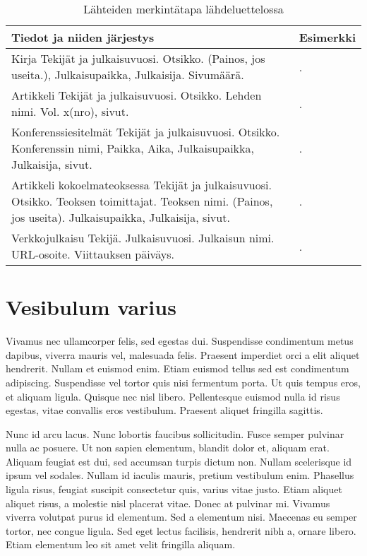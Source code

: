 \begin{table}
\caption{Lähteiden merkintätapa lähdeluettelossa}
\label{table:bibliography}
\begin{center}
\begin{tabular}{ | p{7cm} | p{7cm} | }
	\hline
	\textbf{Tiedot ja niiden järjestys} & \textbf{Esimerkki} \\ \hline
	Kirja \newline 	Tekijät ja julkaisuvuosi. Otsikko. (Painos, jos useita.), Julkaisupaikka, Julkaisija. Sivumäärä. & \fullcite{basar1995dynamic}. \\ \hline
	Artikkeli \newline Tekijät ja julkaisuvuosi. Otsikko. Lehden nimi. Vol. x(nro), sivut. & \fullcite{umble2003enterprise}. \\ \hline
	Konferenssiesitelmät \newline Tekijät ja julkaisuvuosi. Otsikko. Konferenssin nimi, Paikka, Aika, Julkaisupaikka, Julkaisija, sivut. & \fullcite{somers2001impact}. \\ \hline 
	Artikkeli kokoelmateoksessa \newline Tekijät ja julkaisuvuosi. Otsikko. Teoksen toimittajat. Teoksen nimi. (Painos, jos useita). Julkaisupaikka, Julkaisija, sivut. & \fullcite{osmani2013}. \\ \hline
	Verkkojulkaisu \newline Tekijä. Julkaisuvuosi. Julkaisun nimi. URL-osoite. Viittauksen päiväys. & \fullcite{lehman2014biblatex}. \\
	\hline
\end{tabular}
\end{center}
\end{table}

\section{Vesibulum varius}

Vivamus nec ullamcorper felis, sed egestas dui. Suspendisse condimentum metus dapibus, viverra mauris vel, malesuada felis. Praesent imperdiet orci a elit aliquet hendrerit. Nullam et euismod enim. Etiam euismod tellus sed est condimentum adipiscing. Suspendisse vel tortor quis nisi fermentum porta. Ut quis tempus eros, et aliquam ligula. Quisque nec nisl libero. Pellentesque euismod nulla id risus egestas, vitae convallis eros vestibulum. Praesent aliquet fringilla sagittis.

Nunc id arcu lacus. Nunc lobortis faucibus sollicitudin. Fusce semper pulvinar nulla ac posuere. Ut non sapien elementum, blandit dolor et, aliquam erat. Aliquam feugiat est dui, sed accumsan turpis dictum non. Nullam scelerisque id ipsum vel sodales. Nullam id iaculis mauris, pretium vestibulum enim. Phasellus ligula risus, feugiat suscipit consectetur quis, varius vitae justo. Etiam aliquet aliquet risus, a molestie nisl placerat vitae. Donec at pulvinar mi. Vivamus viverra volutpat purus id elementum. Sed a elementum nisi. Maecenas eu semper tortor, nec congue ligula. Sed eget lectus facilisis, hendrerit nibh a, ornare libero. Etiam elementum leo sit amet velit fringilla aliquam.

